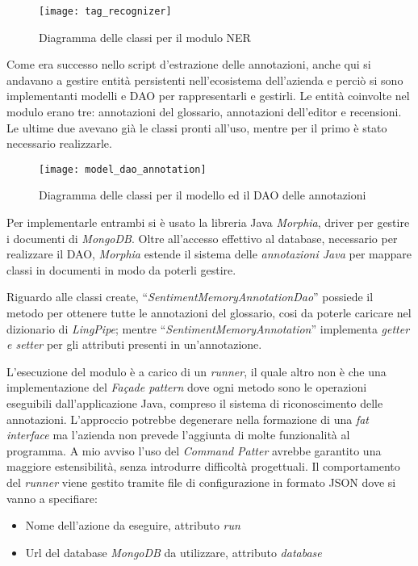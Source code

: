 \begin{figure}[H]
\begin{center}
\texttt{[image: tag\_recognizer]}
\caption{
Diagramma delle classi per il modulo NER
}
\label{fig:tag_recognizer}
\end{center}
\end{figure}

Come era successo nello \gls{script} d'estrazione delle annotazioni, anche qui
si andavano a gestire entità persistenti nell'ecosistema dell'azienda e perciò
si sono implementanti modelli e \gls{DAO} per rappresentarli e gestirli. Le
entità coinvolte nel modulo erano tre: annotazioni del glossario, annotazioni
dell'editor e recensioni. Le ultime due avevano già le classi pronti all'uso,
mentre per il primo è stato necessario realizzarle.

\begin{figure}[H]
\begin{center}
\texttt{[image: model\_dao\_annotation]}
\caption{
Diagramma delle classi per il modello ed il DAO delle annotazioni
}
\label{fig:model_dao_annotation}
\end{center}
\end{figure}

Per implementarle entrambi si è usato la libreria Java \textit{Morphia}, driver
per gestire i documenti di \textit{MongoDB}. Oltre all'accesso effettivo al
database, necessario per realizzare il \gls{DAO}, \textit{Morphia} estende il
sistema delle \textit{annotazioni Java} per mappare classi in documenti in modo
da poterli gestire.

Riguardo alle classi create, ``\textit{SentimentMemoryAnnotationDao}'' possiede
il metodo per ottenere tutte le annotazioni del glossario, cosi da poterle
caricare nel dizionario di \textit{LingPipe}; mentre
``\textit{SentimentMemoryAnnotation}'' implementa \textit{getter e setter} per
gli attributi presenti in un'annotazione.

L'esecuzione del modulo è a carico di un \textit{runner}, il quale
altro non è che una implementazione del \textit{Façade pattern} dove ogni
metodo sono le operazioni eseguibili dall'applicazione Java, compreso il
sistema di riconoscimento delle annotazioni. L'approccio potrebbe degenerare
nella formazione di una \textit{fat interface} ma l'azienda non prevede
l'aggiunta di molte funzionalità al programma. A mio avviso l'uso del
\textit{Command Patter} avrebbe garantito una maggiore estensibilità, senza
introdurre difficoltà progettuali. Il comportamento del \textit{runner} viene
gestito tramite file di configurazione in formato \gls{JSON} dove si vanno a
specifiare:
\begin{itemize}
\item Nome dell'azione da eseguire, attributo \textit{run}
\item Url del database \textit{MongoDB} da utilizzare, attributo
\textit{database}
\end{itemize}

